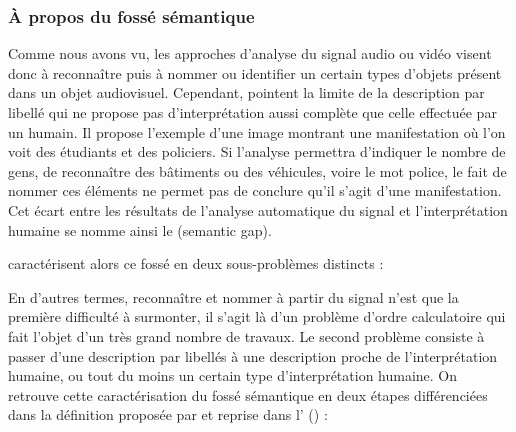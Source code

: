

\subsubsection{À propos du fossé sémantique}
Comme nous avons vu, les approches d'analyse du signal audio ou vidéo visent donc à reconnaître puis à nommer ou identifier un certain types d'objets présent dans un objet audiovisuel. 
Cependant, \cite{hare:semantic-gap} pointent la limite de la description par libellé qui ne propose pas d'interprétation aussi complète que celle effectuée par un humain. 
Il propose l'exemple d'une image montrant une manifestation où l'on voit des étudiants et des policiers. 
Si l'analyse permettra d'indiquer le nombre de gens, de reconnaître des bâtiments ou des véhicules, voire le mot police, le fait de nommer ces éléments ne permet pas de conclure qu'il s'agit d'une manifestation. 
Cet écart entre les résultats de l'analyse automatique du signal et l'interprétation humaine se nomme ainsi le  (semantic gap). 


\citeauthor{hare:semantic-gap} caractérisent alors ce fossé en deux sous-problèmes distincts : 


En d'autres termes, reconnaître et nommer à partir du signal n'est que la première difficulté à surmonter, il s'agit là d'un problème d'ordre calculatoire qui fait l'objet d'un très grand nombre de travaux.
Le second problème consiste à passer d'une description par libellés à une description proche de l'interprétation humaine, ou tout du moins un certain type d'interprétation humaine. 
On retrouve cette caractérisation du fossé sémantique en deux étapes différenciées dans la définition proposée par \cite{Smeulders2000} et reprise dans l' (\cite{Furht2008}) :  %



